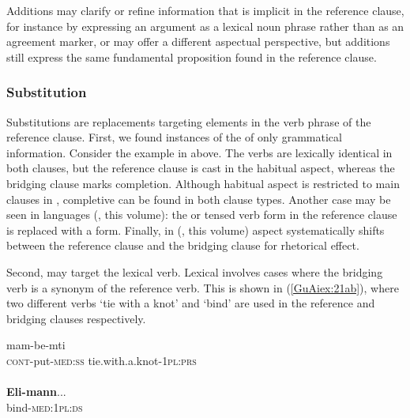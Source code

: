 \documentclass[output=paper]{LSP/langsci}
\begin{document}
Additions may clarify or refine information that is implicit in the reference clause, for instance by expressing an argument as a lexical noun phrase rather than as an agreement marker, or may offer a different aspectual perspective, but additions still express the same fundamental proposition found in the reference clause.

\subsubsection{Substitution}
\label{GuAi314subst}
Substitutions are replacements targeting elements in the verb phrase of the reference clause. First, we found instances of the  of only grammatical information. Consider the  example in  above. The verbs are lexically identical in both clauses, but the reference clause is cast in the habitual aspect, whereas the bridging clause marks completion. Although habitual aspect is restricted to main clauses in , completive can be found in both clause types. Another case may be seen in  languages (\citeauthor{anker18}, this volume): the  or tensed verb form in the reference clause is replaced with a  form. Finally, in  (\citeauthor{jarkey18}, this volume) aspect systematically shifts between the reference clause and the bridging clause for rhetorical effect.

Second,  may target the lexical verb. Lexical  involves cases where the bridging verb is a synonym of the reference verb. This is shown in (\ref{GuAiex:21ab}), where two different verbs `tie with a knot' and `bind' are used in the reference and bridging clauses respectively. 

\begin{exe}
\ex \label{GuAiex:21ab}
\begin{xlist}
\ex \label{GuAiex:21a}
\gll mam-be-mti     \underline{}\\
\textsc{cont}-put-\textsc{med:ss}   tie.with.a.knot-\textsc{1pl:prs} \\
\glt {} \\
\ex \label{GuAiex:21b}
\gll  \textbf{Eli-mann}...\\
bind-\textsc{med:1pl:ds}\\
\glt {}
\end{xlist}
\end{exe}
\end{document}
